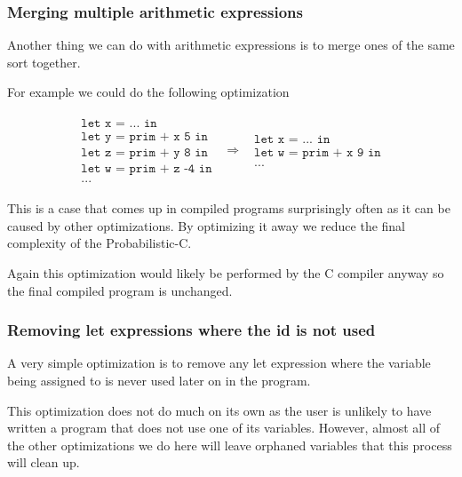 \documentclass[a4paper]{article}
\newcommand{\optimization}[2]{
	\[
		\begin{array}{rcl}
			#1 & \Rightarrow & #2
		\end{array}
	\]
}
\begin{document}
\subsubsection{Merging multiple arithmetic expressions}

Another thing we can do with arithmetic expressions is to merge ones of the same sort together.

For example we could do the following optimization
\optimization{
	\begin{array}{l}
		\texttt{let x = ... in} \\
		\texttt{let y = prim + x 5 in} \\
		\texttt{let z = prim + y 8 in} \\
		\texttt{let w = prim + z -4 in} \\
		\texttt{...}
	\end{array}
}{
	\begin{array}{l}
		\texttt{let x = ... in} \\
		\texttt{let w = prim + x 9 in} \\
		\texttt{...}
	\end{array}
}
This is a case that comes up in compiled programs surprisingly often as it can be caused by other optimizations. By optimizing it away we reduce the final complexity of the Probabilistic-C.

Again this optimization would likely be performed by the C compiler anyway so the final compiled program is unchanged.




\subsubsection{Removing let expressions where the id is not used}

A very simple optimization is to remove any let expression where the variable being assigned to is never used later on in the program.

This optimization does not do much on its own as the user is unlikely to have written a program that does not use one of its variables. However, almost all of the other optimizations we do here will leave orphaned variables that this process will clean up.
\end{document}
